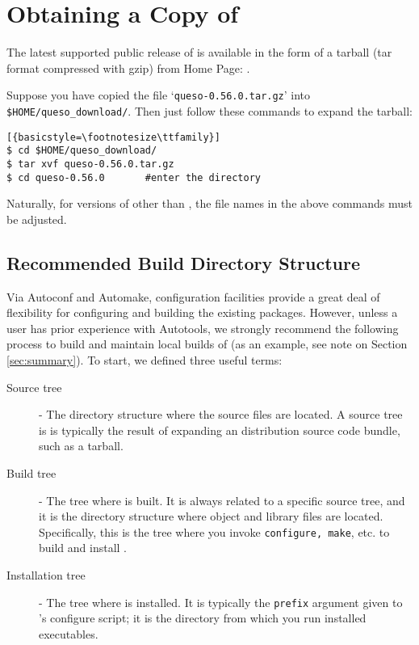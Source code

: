 \section{Obtaining a Copy of \Queso{}}

The latest supported public release of \Queso{} is available in the form of a tarball (tar format compressed with gzip) from \Queso{} Home Page: \Quesoweb.

Suppose you have copied the file `\verb+queso-0.56.0.tar.gz+' into \texttt{\$HOME/queso\_download/}.
Then just follow these commands to expand the tarball:
\begin{lstlisting}[{basicstyle=\footnotesize\ttfamily}]
$ cd $HOME/queso_download/
$ tar xvf queso-0.56.0.tar.gz
$ cd queso-0.56.0   	#enter the directory
\end{lstlisting}

Naturally, for versions of \Queso{} other than \QUESOversion, the file names in the above commands must be adjusted.


\subsection{Recommended Build Directory Structure}\label{sec:Queso_tree}

Via Autoconf and Automake, \Queso{} configuration facilities provide a great deal
of flexibility for configuring and building the existing \Queso{} packages. However,
unless a user has prior experience with Autotools, we strongly recommend
the following process to build and maintain local builds of \Queso{} (as an example, see note on Section \ref{sec:summary}).
To start, we defined three useful terms:

\begin{description}
 \item [Source tree] - The directory structure where the \Queso{} source files are located. A source
tree is is typically the result of expanding an \Queso{} distribution source code bundle, such as a tarball.%
 \item [Build tree] %
- The tree where \Queso{} is built. It is always related to a specific source tree, and it is the directory structure where object and library files are located. Specifically, this is the tree where you invoke \texttt{configure, make}, etc. to build and install \Queso{}.
 \item [Installation tree] - The tree where \Queso{} is installed. It is typically the \texttt{prefix} argument given to \Queso{}'s configure script; it is the directory from which you run installed \Queso{} executables.
\end{description}

